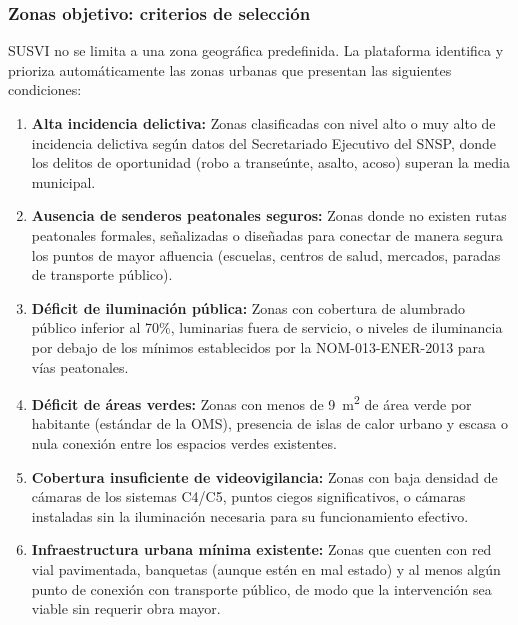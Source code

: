 \documentclass[12pt,a4paper]{article}
\begin{document}
\subsubsection{Zonas objetivo: criterios de selección}

SUSVI no se limita a una zona geográfica predefinida. La plataforma identifica y prioriza automáticamente las zonas urbanas que presentan las siguientes condiciones:

\begin{enumerate}[label=\textbf{\arabic*.}]
    \item \textbf{Alta incidencia delictiva:} Zonas clasificadas con nivel alto o muy alto de incidencia delictiva según datos del Secretariado Ejecutivo del SNSP, donde los delitos de oportunidad (robo a transeúnte, asalto, acoso) superan la media municipal.
    
    \item \textbf{Ausencia de senderos peatonales seguros:} Zonas donde no existen rutas peatonales formales, señalizadas o diseñadas para conectar de manera segura los puntos de mayor afluencia (escuelas, centros de salud, mercados, paradas de transporte público).
    
    \item \textbf{Déficit de iluminación pública:} Zonas con cobertura de alumbrado público inferior al 70\%, luminarias fuera de servicio, o niveles de iluminancia por debajo de los mínimos establecidos por la NOM-013-ENER-2013 para vías peatonales.
    
    \item \textbf{Déficit de áreas verdes:} Zonas con menos de 9~m\textsuperscript{2} de área verde por habitante (estándar de la OMS), presencia de islas de calor urbano y escasa o nula conexión entre los espacios verdes existentes.
    
    \item \textbf{Cobertura insuficiente de videovigilancia:} Zonas con baja densidad de cámaras de los sistemas C4/C5, puntos ciegos significativos, o cámaras instaladas sin la iluminación necesaria para su funcionamiento efectivo.
    
    \item \textbf{Infraestructura urbana mínima existente:} Zonas que cuenten con red vial pavimentada, banquetas (aunque estén en mal estado) y al menos algún punto de conexión con transporte público, de modo que la intervención sea viable sin requerir obra mayor.
\end{enumerate}
\end{document}
